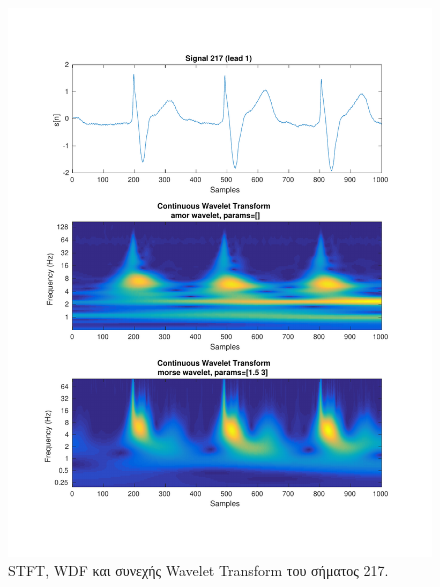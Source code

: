 \documentclass[11pt,a4paper]{article}
\begin{document}
\begin{figure}[H]
\begin{minipage}{0.48\textwidth}
	\includegraphics[width=\textwidth]{fig/217l1_cwt.pdf}
\end{minipage}
\vfill
\caption{STFT, WDF και συνεχής Wavelet Transform του σήματος 217.}
\label{fig:217l1_stft_wdf_wt}
\end{figure}
\end{document}
